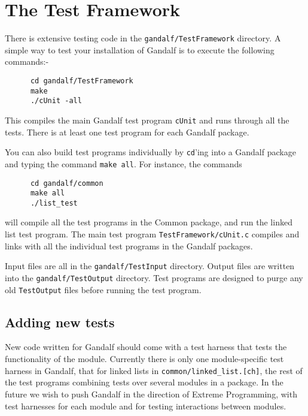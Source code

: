 \chapter{The Test Framework} \label{testing-chapter}
There is extensive testing code in the {\tt gandalf/TestFramework}
directory. A simple way to test your installation of Gandalf is to
execute the following commands:-
\begin{verbatim}
      cd gandalf/TestFramework
      make
      ./cUnit -all
\end{verbatim}
This compiles the main Gandalf test program {\tt cUnit} and runs through
all the tests. There is at least one test program for each Gandalf package.

You can also build test programs individually by {\tt cd}'ing into a
Gandalf package and typing the command {\tt make all}. For instance,
the commands
\begin{verbatim}
      cd gandalf/common
      make all
      ./list_test
\end{verbatim}
will compile all the test programs in the Common package, and run the linked
list test program.
The main test program {\tt TestFramework/cUnit.c} compiles and links with
all the individual test programs in the Gandalf packages.

Input files are all in the {\tt gandalf/TestInput} directory. Output files
are written into the {\tt gandalf/TestOutput} directory. Test programs are
designed to purge any old {\tt TestOutput} files before running the test
program.

\section{Adding new tests}
New code written for Gandalf should come with a test harness that tests
the functionality of the module. Currently there is only one module-specific
test harness in Gandalf, that for linked lists in
{\tt common/linked\_list.[ch]}, the rest of the test programs combining
tests over several modules in a package.
In the future we wish to push Gandalf
in the direction of Extreme Programming, with test harnesses for each module
and for testing interactions between modules.

